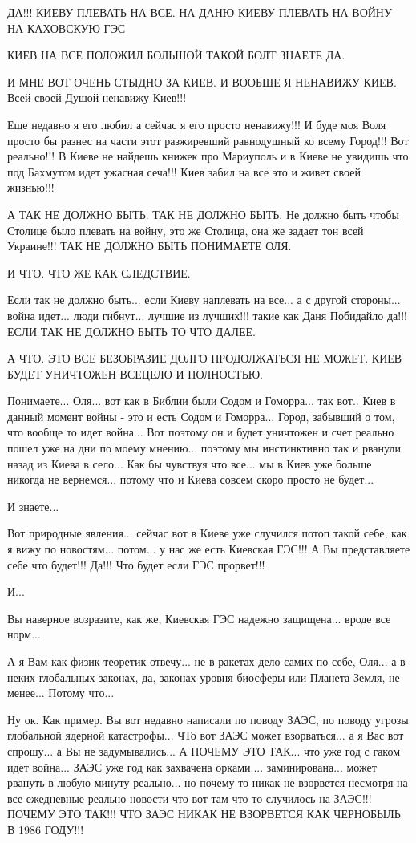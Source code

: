 ДА!!! КИЕВУ ПЛЕВАТЬ НА ВСЕ. НА ДАНЮ КИЕВУ ПЛЕВАТЬ НА ВОЙНУ НА КАХОВСКУЮ ГЭС

КИЕВ НА ВСЕ ПОЛОЖИЛ БОЛЬШОЙ ТАКОЙ БОЛТ ЗНАЕТЕ ДА.

И МНЕ ВОТ ОЧЕНЬ СТЫДНО ЗА КИЕВ. И ВООБЩЕ Я НЕНАВИЖУ КИЕВ. Всей своей Душой ненавижу Киев!!!

Еще недавно я его любил а сейчас я его просто ненавижу!!! И буде моя Воля просто бы разнес 
на части этот разжиревший равнодушный ко всему Город!!! Вот реально!!! В Киеве не найдешь
книжек про Мариуполь и в Киеве не увидишь что под Бахмутом идет ужасная сеча!!! Киев забил на все это
и живет своей жизнью!!!

А ТАК НЕ ДОЛЖНО БЫТЬ. ТАК НЕ ДОЛЖНО БЫТЬ. Не должно быть чтобы Столице было плевать на войну, это
же Столица, она же задает тон всей Украине!!! ТАК НЕ ДОЛЖНО БЫТЬ ПОНИМАЕТЕ ОЛЯ.

И ЧТО. ЧТО ЖЕ КАК СЛЕДСТВИЕ.

Если так не должно быть... если Киеву наплевать на все... а с другой стороны... война идет... люди гибнут...
лучшие из лучших!!! такие как Даня Побидайло да!!! ЕСЛИ ТАК НЕ ДОЛЖНО БЫТЬ ТО ЧТО ДАЛЕЕ.

А ЧТО. ЭТО ВСЕ БЕЗОБРАЗИЕ ДОЛГО ПРОДОЛЖАТЬСЯ НЕ МОЖЕТ. КИЕВ БУДЕТ УНИЧТОЖЕН ВСЕЦЕЛО И ПОЛНОСТЬЮ.

Понимаете... Оля... вот как в Библии были Содом и Гоморра... так вот.. Киев в
данный момент войны - это и есть Содом и Гоморра... Город, забывший о том, что
вообще то идет война... Вот поэтому он и будет уничтожен и счет реально пошел
уже на дни по моему мнению... поэтому мы инстинктивно так и рванули назад из
Киева в село...  Как бы чувствуя что все... мы в Киев уже больше никогда не
вернемся... потому что и Киева совсем скоро просто не будет...

И знаете...

Вот природные явления... сейчас вот в Киеве уже случился потоп такой себе, как я вижу по новостям...
потом... у нас же есть Киевская ГЭС!!! А Вы представляете себе что будет!!! Да!!! Что будет если ГЭС прорвет!!!

И...

Вы наверное возразите, как же, Киевская ГЭС надежно защищена... вроде все норм...

А я Вам как физик-теоретик отвечу... не в ракетах дело самих по себе, Оля... а в неких
глобальных законах, да, законах уровня биосферы или Планета Земля, не менее...
Потому что...

Ну ок. Как пример. Вы вот недавно написали по поводу ЗАЭС, по поводу угрозы
глобальной ядерной катастрофы...  ЧТо вот ЗАЭС может взорваться... а я Вас вот
спрошу... а Вы не задумывались... А ПОЧЕМУ ЭТО ТАК...  что уже год с гаком идет
война... ЗАЭС уже год как захвачена орками.... заминирована... может рвануть в
любую минуту реально... но почему то никак не взорвется несмотря на все
ежедневные реально новости что вот там что то случилось на ЗАЭС!!! ПОЧЕМУ ЭТО
ТАК!!! ЧТО ЗАЭС НИКАК НЕ ВЗОРВЕТСЯ КАК ЧЕРНОБЫЛЬ В 1986 ГОДУ!!!

